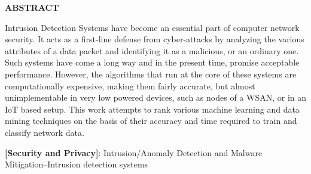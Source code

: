 \begin{center}
\Large{\textbf{ABSTRACT}}\\
\end{center}
Intrusion Detection Systems have become an essential part of computer network security. It acts as a first-line defense from cyber-attacks by analyzing the various attributes of a data packet and identifying it as a malicious, or an ordinary one. Such systems have come a long way and in the present time, promise acceptable performance. However, the algorithms that run at the core of these systems are computationally expensive, making them fairly accurate, but almost unimplementable in very low powered devices, such as nodes of a WSAN, or in an IoT based setup. This work attempts to rank various machine learning and data mining techniques on the basis of their accuracy and time required to train and classify network data.

\par
\textbf{[Security and Privacy]}: Intrusion/Anomaly Detection and Malware Mitigation--Intrusion detection systems
